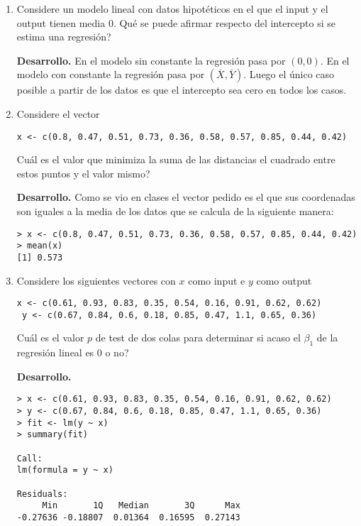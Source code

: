 \documentclass[11pt,oneside,spanish]{article}
\theoremstyle{definition}
\theoremstyle{definition}\newtheorem{definicion}{Definicin}
\theoremstyle{definition}\newtheorem{ejemplo}{Ejemplo}
\theoremstyle{remark}\newtheorem{nota}{\textsc{Nota}}
\theoremstyle{definition}\newtheorem{proposicion}{Proposicin}
\theoremstyle{definition}\newtheorem{problema}{Problema}
\begin{document}
\begin{enumerate}[(1)]
\item Considere un modelo  lineal con datos hipot\'eticos en el que el input y el output tienen media 0. {\textquestiondown}Qu\'e se puede afirmar respecto del intercepto si se estima una regresi\'on?		

\textbf{Desarrollo.}
En el modelo sin constante la regresi\'on pasa por $(0,0)$. En el modelo con constante la regresi\'on pasa por $(\overline{X},\overline{Y})$. Luego el \'unico caso posible a partir de los datos es que el intercepto sea cero en todos los casos.

\item Considere el vector
\begin{lstlisting}[backgroundcolor=\color{Gray!20},frame=none,basicstyle=\ttfamily]
 x <- c(0.8, 0.47, 0.51, 0.73, 0.36, 0.58, 0.57, 0.85, 0.44, 0.42)
\end{lstlisting}
{\textquestiondown}Cu\'al es el valor que minimiza la suma de las distancias el cuadrado entre estos puntos y el valor mismo?

\textbf{Desarrollo.}
Como se vio en clases el vector pedido es el que sus coordenadas son iguales a la media de los datos que se calcula de la siguiente manera:
\begin{lstlisting}[backgroundcolor=\color{Gray!20},frame=none,basicstyle=\ttfamily]
> x <- c(0.8, 0.47, 0.51, 0.73, 0.36, 0.58, 0.57, 0.85, 0.44, 0.42)
> mean(x)
[1] 0.573
\end{lstlisting}

\item Considere los siguientes vectores con $x$ como input e $y$ como output
\begin{lstlisting}[backgroundcolor=\color{Gray!20},frame=none,basicstyle=\ttfamily]
 x <- c(0.61, 0.93, 0.83, 0.35, 0.54, 0.16, 0.91, 0.62, 0.62)
 y <- c(0.67, 0.84, 0.6, 0.18, 0.85, 0.47, 1.1, 0.65, 0.36)
\end{lstlisting}
{\textquestiondown}Cu\'al es el valor $p$ de test de dos colas para determinar si acaso el $\beta_1$ de la regresi\'on lineal es 0 o no?

\textbf{Desarrollo.}
\begin{lstlisting}[backgroundcolor=\color{Gray!20},frame=none,basicstyle=\ttfamily]
> x <- c(0.61, 0.93, 0.83, 0.35, 0.54, 0.16, 0.91, 0.62, 0.62)
> y <- c(0.67, 0.84, 0.6, 0.18, 0.85, 0.47, 1.1, 0.65, 0.36)
> fit <- lm(y ~ x)
> summary(fit)

Call:
lm(formula = y ~ x)

Residuals:
     Min       1Q   Median       3Q      Max 
-0.27636 -0.18807  0.01364  0.16595  0.27143 


\end{lstlisting}
\end{enumerate}
\end{document}
